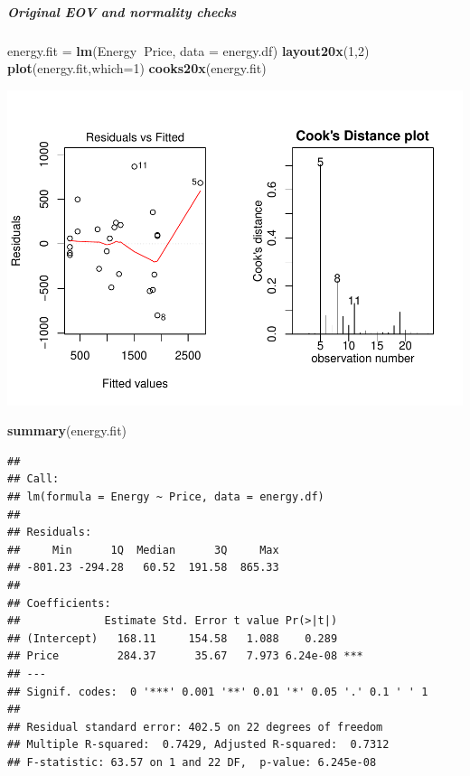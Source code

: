 \documentclass[]{article}
\newenvironment{Shaded}{\begin{snugshade}}{\end{snugshade}}
\newcommand{\DataTypeTok}[1]{\textcolor[rgb]{0.13,0.29,0.53}{#1}}
\newcommand{\DecValTok}[1]{\textcolor[rgb]{0.00,0.00,0.81}{#1}}
\newcommand{\KeywordTok}[1]{\textcolor[rgb]{0.13,0.29,0.53}{\textbf{#1}}}
\newcommand{\NormalTok}[1]{#1}
\newcommand{\OperatorTok}[1]{\textcolor[rgb]{0.81,0.36,0.00}{\textbf{#1}}}
\newcommand{\StringTok}[1]{\textcolor[rgb]{0.31,0.60,0.02}{#1}}
\let\oldsubparagraph\subparagraph
\renewcommand{\subparagraph}[1]{\oldsubparagraph{#1}\mbox{}}
\begin{document}
\hypertarget{original-eov-and-normality-checks}{%
\subparagraph{Original EOV and normality
checks}\label{original-eov-and-normality-checks}}

\begin{Shaded}
\begin{Highlighting}[]
\NormalTok{energy.fit =}\StringTok{ }\KeywordTok{lm}\NormalTok{(Energy}\OperatorTok{~}\NormalTok{Price, }\DataTypeTok{data =}\NormalTok{ energy.df)}
\KeywordTok{layout20x}\NormalTok{(}\DecValTok{1}\NormalTok{,}\DecValTok{2}\NormalTok{)}
\KeywordTok{plot}\NormalTok{(energy.fit,}\DataTypeTok{which=}\DecValTok{1}\NormalTok{)}
\KeywordTok{cooks20x}\NormalTok{(energy.fit)}
\end{Highlighting}
\end{Shaded}

\includegraphics{Engsci211assignment2_task2_files/figure-latex/unnamed-chunk-3-1.pdf}

\begin{Shaded}
\begin{Highlighting}[]
\KeywordTok{summary}\NormalTok{(energy.fit)}
\end{Highlighting}
\end{Shaded}

\begin{verbatim}
## 
## Call:
## lm(formula = Energy ~ Price, data = energy.df)
## 
## Residuals:
##     Min      1Q  Median      3Q     Max 
## -801.23 -294.28   60.52  191.58  865.33 
## 
## Coefficients:
##             Estimate Std. Error t value Pr(>|t|)    
## (Intercept)   168.11     154.58   1.088    0.289    
## Price         284.37      35.67   7.973 6.24e-08 ***
## ---
## Signif. codes:  0 '***' 0.001 '**' 0.01 '*' 0.05 '.' 0.1 ' ' 1
## 
## Residual standard error: 402.5 on 22 degrees of freedom
## Multiple R-squared:  0.7429, Adjusted R-squared:  0.7312 
## F-statistic: 63.57 on 1 and 22 DF,  p-value: 6.245e-08
\end{verbatim}
\end{document}
